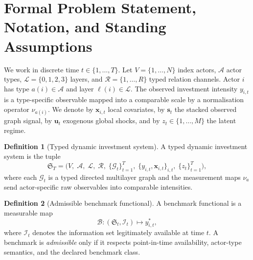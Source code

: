 \documentclass[11pt,a4paper]{article}
\theoremstyle{definition}
\newtheorem{definition}{Definition}[section]
\newcommand{\bx}{\bm{x}}
\newcommand{\bs}{\bm{s}}
\newcommand{\bu}{\bm{u}}
\begin{document}
\section{Formal Problem Statement, Notation, and Standing Assumptions}
\label{sec:formalproblem}

We work in discrete time $t \in \{1,\ldots,T\}$. Let $V = \{1,\ldots,N\}$ index actors, $\mathcal{A}$ actor types, $\mathcal{L} = \{0,1,2,3\}$ layers, and $\mathcal{R} = \{1,\ldots,R\}$ typed relation channels. Actor $i$ has type $a(i) \in \mathcal{A}$ and layer $\ell(i) \in \mathcal{L}$. The observed investment intensity $y_{i,t}$ is a type-specific observable mapped into a comparable scale by a normalisation operator $\nu_{a(i)}$. We denote by $\bx_{i,t}$ local covariates, by $\bs_t$ the stacked observed graph signal, by $\bu_t$ exogenous global shocks, and by $z_t \in \{1,\ldots,M\}$ the latent regime.

\begin{definition}[Typed dynamic investment system]
\label{def:system}
A typed dynamic investment system is the tuple
\[
  \mathfrak{S}_T = \bigl(V,\;\mathcal{A},\;\mathcal{L},\;\mathcal{R},\;\{\mathcal{G}_t\}_{t=1}^T,\;\{y_{i,t}, \bx_{i,t}\}_{i,t},\;\{z_t\}_{t=1}^T\bigr),
\]
where each $\mathcal{G}_t$ is a typed directed multilayer graph and the measurement maps $\nu_a$ send actor-specific raw observables into comparable intensities.
\end{definition}

\begin{definition}[Admissible benchmark functional]
\label{def:benchmark_functional}
A benchmark functional is a measurable map
\[
  \mathcal{B}: (\mathfrak{S}_t, \mathcal{I}_t) \mapsto y^*_{i,t},
\]
where $\mathcal{I}_t$ denotes the information set legitimately available at time $t$. A benchmark is \emph{admissible} only if it respects point-in-time availability, actor-type semantics, and the declared benchmark class.
\end{definition}
\end{document}
